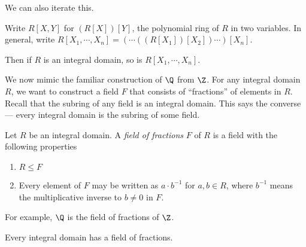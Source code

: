 \documentclass[a4paper]{article}
\begin{document}
We can also iterate this.

\begin{notation}
  Write $R[X, Y]$ for $(R[X])[Y]$, the polynomial ring of $R$ in two variables. In general, write $R[X_1, \cdots, X_n] = (\cdots((R[X_1])[X_2]) \cdots )[X_n]$.
\end{notation}

Then if $R$ is an integral domain, so is $R[X_1, \cdots, X_n]$.

We now mimic the familiar construction of $\Q$ from $\Z$. For any integral domain $R$, we want to construct a field $F$ that consists of ``fractions'' of elements in $R$. Recall that the subring of any field is an integral domain. This says the converse --- every integral domain is the subring of some field.

\begin{defi}
  Let $R$ be an integral domain. A \emph{field of fractions} $F$ of $R$ is a field with the following properties
  \begin{enumerate}
    \item $R \leq F$
    \item Every element of $F$ may be written as $a \cdot b^{-1}$ for $a, b \in R$, where $b^{-1}$ means the multiplicative inverse to $b \not= 0$ in $F$.
  \end{enumerate}
\end{defi}
For example, $\Q$ is the field of fractions of $\Z$.

\begin{thm}
  Every integral domain has a field of fractions.
\end{thm}
\end{document}
